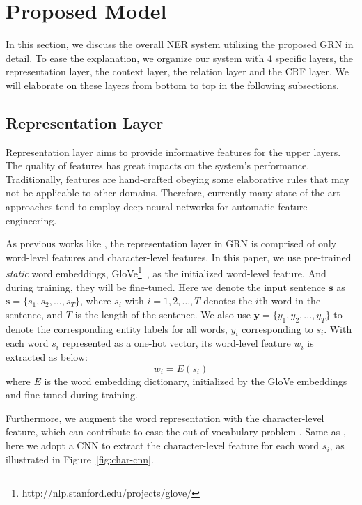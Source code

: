 \documentclass[letterpaper]{article} \usepackage{aaai19}  \usepackage{times}  \usepackage{helvet}  \usepackage{courier}  \usepackage{url}  \usepackage{graphicx}  \usepackage{amsmath}
\newcommand{\ie}{\text{i.e.,}}
\newcommand{\GRN}{GRN}
\begin{document}
\section{Proposed Model}
In this section, we discuss the overall NER system utilizing the proposed \GRN{} in detail. To ease the explanation, we organize our system with 4 specific layers, \ie{} the representation layer, the context layer, the relation layer and the CRF layer. We will elaborate on these layers from bottom to top in the following subsections.



\subsection{Representation Layer}
Representation layer aims to provide informative features for the upper layers. The quality of features has great impacts on the system's performance. Traditionally, features are hand-crafted obeying some elaborative rules that may not be applicable to other domains. Therefore, currently many state-of-the-art approaches tend to employ deep neural networks for automatic feature engineering.

As previous works like \cite{Ye2018HSCRF}, the representation layer in \GRN{} is comprised of only word-level features and character-level features. In this paper, we use pre-trained \textit{static} word embeddings, \ie{} GloVe\footnote{http://nlp.stanford.edu/projects/glove/}~\cite{pennington2014glove}, as the initialized word-level feature. And during training, they will be fine-tuned. Here we denote the input sentence $\bm{s}$ as $\bm{s}=\{s_1,s_2,...,s_T\}$, where $s_i$ with $i=1,2,\ldots,T$ denotes the $i$th word in the sentence, and $T$ is the length of the sentence. We also use $\bm{y}=\{y_1,y_2,...,y_T\}$ to denote the corresponding entity labels for all words, \ie{} $y_i$ corresponding to $s_i$. With each word $s_i$ represented as a one-hot vector, its word-level feature $w_i$ is extracted as below:
\begin{equation}
\label{eq:word_embed}
w_i = E(s_i)
\end{equation}
where $E$ is the word embedding dictionary, initialized by the GloVe embeddings and fine-tuned during training.

Furthermore, we augment the word representation with the character-level feature, which can contribute to ease the out-of-vocabulary problem \cite{rei2016attending}. Same as \cite{ma2016CNNBLSTMCRF}, here we adopt a CNN to extract the character-level feature for each word $s_i$, as illustrated in Figure~\ref{fig:char-cnn}.
\end{document}
